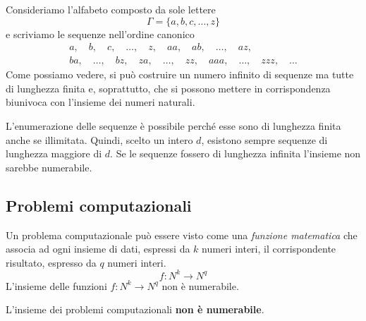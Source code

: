 \begin{example}
	Consideriamo l'alfabeto composto da sole lettere
	\[ \Gamma = \{ a, b, c, \dots, z \} \]
	e scriviamo le sequenze nell'ordine canonico
	\begin{gather*}
		a, \quad b, \quad c, \quad \dots, \quad z, \quad aa, \quad ab, \quad \dots, \quad az, \\
		ba, \quad \dots, \quad bz, \quad za, \quad \dots, \quad zz, \quad aaa, \quad \dots, \quad zzz, \quad \dots
	\end{gather*}
	Come possiamo vedere, si pu\`o costruire un numero infinito di sequenze ma tutte di lunghezza finita e, soprattutto,
	che si possono mettere in corrispondenza biunivoca con l'insieme dei numeri naturali.
\end{example}

\begin{observation}
	L'enumerazione delle sequenze \`e possibile perch\'e esse sono di lunghezza finita anche se illimitata. Quindi,
	scelto un intero $d$, esistono sempre sequenze di lunghezza maggiore di $d$. Se le sequenze fossero di lunghezza
	infinita l'insieme non sarebbe numerabile.
\end{observation}


\subsection{Problemi computazionali}
Un problema computazionale pu\`o essere visto come una \emph{funzione matematica} che associa ad ogni insieme di dati,
espressi da $k$ numeri interi, il corrispondente risultato, espresso da $q$ numeri interi.
\[ f : N^k \rightarrow N^q \]
L'insieme delle funzioni $f : N^k \rightarrow N^q$ non \`e numerabile.

\begin{theorem}\label{th: non_num}
	L'insieme dei problemi computazionali \textbf{non \`e numerabile}.
\end{theorem}

